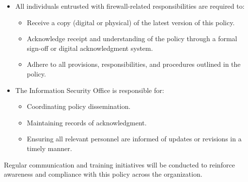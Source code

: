 \begin{itemize}
\item All individuals entrusted with firewall-related responsibilities are required to:
    \begin{itemize}
    \item Receive a copy (digital or physical) of the latest version of this policy.
    
    \item Acknowledge receipt and understanding of the policy through a formal sign-off or digital acknowledgment system.
    
    \item Adhere to all provisions, responsibilities, and procedures outlined in the policy.
    \end{itemize}
    
    \item The Information Security Office is responsible for:
    \begin{itemize}
    \item Coordinating policy dissemination.
    
    \item Maintaining records of acknowledgment.
    
    \item Ensuring all relevant personnel are informed of updates or revisions in a timely manner.
    \end{itemize}
\end{itemize}
Regular communication and training initiatives will be conducted to reinforce awareness and compliance with this policy across the organization.




